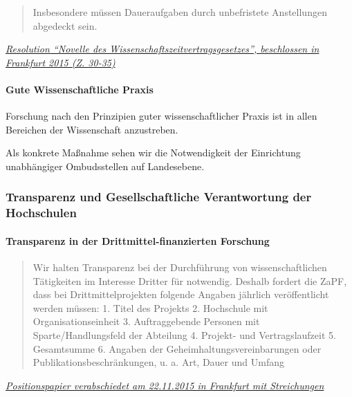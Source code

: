 \begin{quote}
Insbesondere müssen Daueraufgaben durch unbefristete Anstellungen
abgedeckt sein.
\end{quote}

\href{https://zapfev.de/resolutionen/wise15/WissZeitVG/Stellungnahme_WiSe15_WissZeitVG.pdf}{\emph{Resolution
``Novelle des Wissenschaftszeitvertragsgesetzes'', beschlossen in
Frankfurt 2015 (Z. 30-35)}}

\hypertarget{gute-wissenschaftliche-praxis}{%
\paragraph{Gute Wissenschaftliche
Praxis}\label{gute-wissenschaftliche-praxis}}

Forschung nach den Prinzipien guter wissenschaftlicher Praxis ist in
allen Bereichen der Wissenschaft anzustreben.

Als konkrete Maßnahme sehen wir die Notwendigkeit der Einrichtung
unabhängiger Ombudsstellen auf Landesebene.

\hypertarget{transparenz-und-gesellschaftliche-verantwortung-der-hochschulen}{%
\subsubsection{Transparenz und Gesellschaftliche Verantwortung der
Hochschulen}\label{transparenz-und-gesellschaftliche-verantwortung-der-hochschulen}}

\hypertarget{transparenz-in-der-drittmittel-finanzierten-forschung}{%
\paragraph{Transparenz in der Drittmittel-finanzierten
Forschung}\label{transparenz-in-der-drittmittel-finanzierten-forschung}}

\begin{quote}
Wir halten Transparenz bei der Durchführung von wissenschaftlichen
Tätigkeiten im Interesse Dritter für notwendig. Deshalb fordert die
ZaPF, dass bei Drittmittelprojekten folgende Angaben jährlich
veröffentlicht werden müssen: 1. Titel des Projekts 2. Hochschule mit
Organisationseinheit 3. Auftraggebende Personen mit Sparte/Handlungsfeld
der Abteilung 4. Projekt- und Vertragslaufzeit 5. Gesamtsumme 6. Angaben
der Geheimhaltungsvereinbarungen oder Publikationsbeschränkungen, u. a.
Art, Dauer und Umfang
\end{quote}

\href{https://zapf.wiki/images/d/dc/Stellungnahme_WiSe15_Transparenz_in_der_Drittmittelforschung.pdf}{\emph{Positionspapier
verabschiedet am 22.11.2015 in Frankfurt mit Streichungen}}

